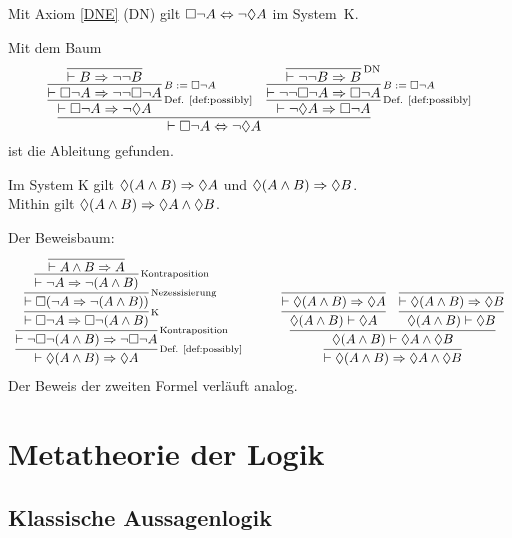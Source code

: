 \begin{Satz} Mit Axiom \ref{DNE} (DN) gilt $\Box\neg A\Leftrightarrow\neg\Diamond A$
im System~K.
\end{Satz}
\begin{Beweis}
Mit dem Baum
\[
\infer{\vdash \lnec\neg A\bicond\neg\lpos A}{
  \infer[\infernote{Def. \ref{def:possibly}}]{\vdash\lnec\neg A\cond\neg\lpos A}{
    \infer[\infernote{$B:=\lnec\neg A$}\quad]{\vdash\lnec\neg A\cond\neg\neg\lnec\neg A}{
      \infer{\vdash B\cond\neg\neg B}{}}}
& \infer[\infernote{Def. \ref{def:possibly}}]{\vdash\neg\lpos A\cond\lnec\neg A}{
    \infer[\infernote{$B:=\lnec\neg A$}]{\vdash\neg\neg\lnec\neg A\cond\lnec\neg A}{
      \infer[\infernote{DN}]{\vdash\neg\neg B\cond B}{}}}}
\]
ist die Ableitung gefunden.\,\qedsymbol
\end{Beweis}

\begin{Satz}
Im System K gilt $\Diamond (A\land B)\Rightarrow\Diamond A$
und $\Diamond (A\land B)\Rightarrow\Diamond B$.\\
Mithin gilt $\Diamond (A\land B)\Rightarrow\Diamond A\land\Diamond B$.
\end{Satz}
\begin{Beweis} Der Beweisbaum:
\[
\begin{array}{l@{\qquad\quad}l}
\infer[\infernote{Def. \ref{def:possibly}}]{\vdash\lpos (A\land B)\cond\lpos A}{
  \infer[\infernote{Kontraposition}]{\vdash\neg\lnec\neg (A\land B)\cond\neg\lnec\neg A}{
    \infer[\infernote{K}]{\vdash\lnec\neg A\cond\lnec\neg (A\land B)}{
      \infer[\infernote{Nezessisierung}]{\vdash\lnec(\neg A\cond\neg (A\land B))}{
        \infer[\infernote{Kontraposition}]{\vdash\neg A\cond\neg (A\land B)}{
          \infer{\vdash A\land B\cond A}{}}}}}}
&
\infer{\vdash\lpos (A\land B)\cond\lpos A\land\lpos B}{
  \infer{\lpos (A\land B)\vdash\lpos A\land\lpos B}{
    \infer{\lpos (A\land B)\vdash\lpos A}{
      \infer{\vdash\lpos (A\land B)\cond\lpos A}{}}
  & \infer{\lpos (A\land B)\vdash\lpos B}{
      \infer{\vdash\lpos (A\land B)\cond\lpos B}{}}}}
\end{array}
\]
Der Beweis der zweiten Formel verläuft analog.\,\qedsymbol
\end{Beweis}

\newpage
\section{Metatheorie der Logik}
\subsection{Klassische Aussagenlogik}

